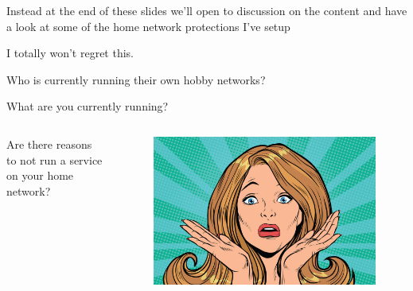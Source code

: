 \documentclass{beamer}
\begin{document}
\begin{frame}
    \begin{center}
        Instead at the end of these slides we'll open to discussion on the content and 
        have a look at some of the home network protections I've setup
    \end{center}
\end{frame}

\begin{frame}
    \begin{center}
        I totally won't regret this.
    \end{center}
\end{frame}

\begin{frame}
    \begin{center}
        Who is currently running their own hobby networks?
        \vspace{5mm}\par\noindent
        What are you currently running?
    \end{center}
\end{frame}

\begin{frame}
    \begin{columns}
        \begin{column}{0.5\textwidth}
            Are there reasons to not run a service on your home network?
        \end{column}
        \begin{column}{0.5\textwidth}
            \begin{figure}
                \centering
                \includegraphics[width=\textwidth,keepaspectratio]{../resources/confusion.jpg}
            \end{figure}
        \end{column}
    \end{columns}
\end{frame}
\end{document}
